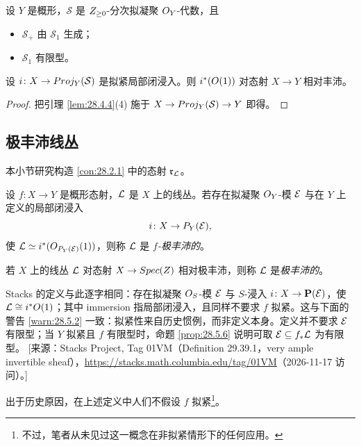 \begin{corollary}\label{cor:28.4.6}
设 $Y$ 是概形，$\mathcal S$ 是 $Z_{\ge 0}$-分次拟凝聚 $O_Y$-代数，且
\begin{itemize}[leftmargin=1.6em,itemsep=0.2ex]
  \item $\mathcal S_+$ 由 $\mathcal S_1$ 生成；
  \item $\mathcal S_1$ 有限型。
\end{itemize}
设 $i\colon X\to Proj_Y(\mathcal S)$ 是拟紧局部闭浸入。则 $i^*(O(1))$ 对态射 $X\to Y$ 相对丰沛。
\end{corollary}

\begin{proof}
把引理 \ref{lem:28.4.4}(4) 施于 $X\to Proj_Y(\mathcal S)\to Y$ 即得。
\end{proof}

\subsection{极丰沛线丛}\label{sec:28.5}

本小节研究构造 \ref{con:28.2.1} 中的态射 $\mathfrak r_{\mathcal{L}}$。

\begin{definition}\label{def:28.5.1}
设 $f\colon X\to Y$ 是概形态射，$\mathcal{L}$ 是 $X$ 上的线丛。若存在拟凝聚 $O_Y$-模 $\mathcal{E}$ 与在 $Y$ 上定义的局部闭浸入
\[
i\colon X\to P_Y(\mathcal{E}),
\]
使 $\mathcal{L}\simeq i^*(O_{P_Y(\mathcal{E})}(1))$，则称 $\mathcal{L}$ 是 \emph{$f$-极丰沛的}。

若 $X$ 上的线丛 $\mathcal{L}$ 对态射 $X\to Spec(Z)$ 相对极丰沛，则称 $\mathcal{L}$ 是\emph{极丰沛的}。
\end{definition}

\begin{yizhu}
Stacks 的定义与此逐字相同：存在拟凝聚 $O_S$-模 $\mathcal{E}$ 与 $S$-浸入 $i\colon X\to\mathbf P(\mathcal{E})$，使 $\mathcal{L}\cong i^*O(1)$；其中 immersion 指局部闭浸入，且同样不要求 $f$ 拟紧。这与下面的警告 \ref{warn:28.5.2} 一致：拟紧性来自历史惯例，而非定义本身。定义并不要求 $\mathcal{E}$ 有限型；当 $Y$ 拟紧且 $f$ 有限型时，命题 \ref{prop:28.5.6} 说明可取 $\mathcal{E}\subseteq f_*\mathcal{L}$ 为有限型。
[来源：Stacks Project, Tag 01VM（Definition 29.39.1，very ample invertible sheaf），\url{https://stacks.math.columbia.edu/tag/01VM}（2026-11-17 访问）。]
\end{yizhu}

\begin{warning}\label{warn:28.5.2}
出于历史原因，在上述定义中人们不假设 $f$ 拟紧\footnote{不过，笔者从未见过这一概念在非拟紧情形下的任何应用。}。
\end{warning}

